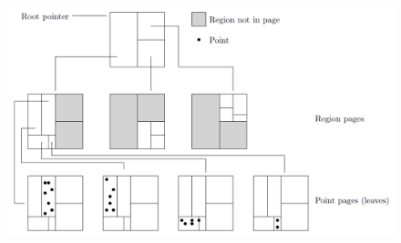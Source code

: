 \begin{itemize}
    \begin{figure}[h]
         \centering
         \includegraphics[width=.7\linewidth]{images/DBMS_Internals/MultiDimensionalDataOrganizations/kdb-tree.jpeg}
    \end{figure}
\end{itemize}

